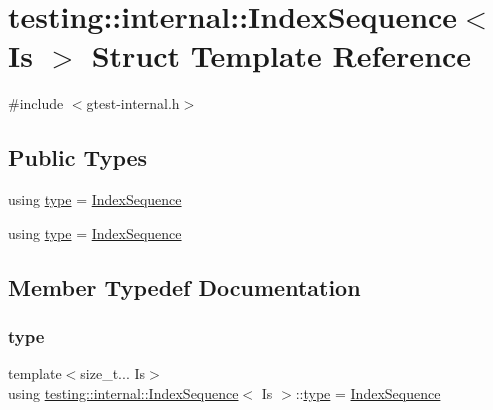 \hypertarget{structtesting_1_1internal_1_1_index_sequence}{}\section{testing\+::internal\+::Index\+Sequence$<$ Is $>$ Struct Template Reference}
\label{structtesting_1_1internal_1_1_index_sequence}


{\ttfamily \#include $<$gtest-\/internal.\+h$>$}

\subsection*{Public Types}
\begin{DoxyCompactItemize}
\item 
using \mbox{\hyperlink{structtesting_1_1internal_1_1_index_sequence_a89bb13a7b5d169b69659f395dcec2b2d}{type}} = \mbox{\hyperlink{structtesting_1_1internal_1_1_index_sequence}{Index\+Sequence}}
\item 
using \mbox{\hyperlink{structtesting_1_1internal_1_1_index_sequence_a89bb13a7b5d169b69659f395dcec2b2d}{type}} = \mbox{\hyperlink{structtesting_1_1internal_1_1_index_sequence}{Index\+Sequence}}
\end{DoxyCompactItemize}


\subsection{Member Typedef Documentation}
\mbox{\label{structtesting_1_1internal_1_1_index_sequence_a89bb13a7b5d169b69659f395dcec2b2d}} 
\subsubsection{\texorpdfstring{type}{type}\hspace{0.1cm}{\footnotesize\ttfamily [1/2]}}
{\footnotesize\ttfamily template$<$size\+\_\+t... Is$>$ \\
using \mbox{\hyperlink{structtesting_1_1internal_1_1_index_sequence}{testing\+::internal\+::\+Index\+Sequence}}$<$ Is $>$\+::\mbox{\hyperlink{structtesting_1_1internal_1_1_index_sequence_a89bb13a7b5d169b69659f395dcec2b2d}{type}} =  \mbox{\hyperlink{structtesting_1_1internal_1_1_index_sequence}{Index\+Sequence}}}

